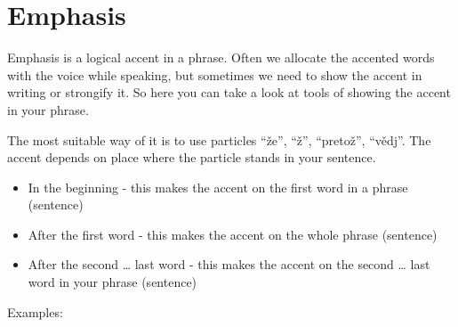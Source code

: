 \section{Emphasis}

Emphasis is a logical accent in a phrase. Often we allocate the accented words with the voice while speaking, but sometimes we need to show the accent in writing or strongify it. So here you can take a look at tools of showing the accent in your phrase.

The most suitable way of it is to use particles “že”, “ž”, “pretož”, “vědj”. The accent depends on place where the particle stands in your sentence. 

\begin{itemize}
	\item In the beginning - this makes the accent on the first word in a phrase (sentence)
	\item After the first word - this makes the accent on the whole phrase (sentence)
	\item After the second … last word - this makes the accent on the second … last word in your phrase (sentence)
\end{itemize}

Examples:
